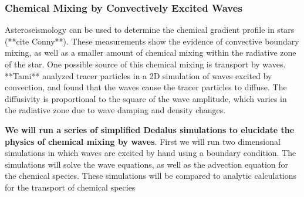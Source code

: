 {\color{purple}
\subsubsection{Chemical Mixing by Convectively Excited Waves}
}

Asteroseismology can be used to determine the chemical gradient profile in stars (**cite Conny**). These measurements show the evidence of convective boundary mixing, as well as a smaller amount of chemical mixing within the radiative zone of the star. One possible source of this chemical mixing is transport by waves. **Tami** analyzed tracer particles in a 2D simulation of waves excited by convection, and found that the waves cause the tracer particles to diffuse. The diffusivity is proportional to the square of the wave amplitude, which varies in the radiative zone due to wave damping and density changes.

\textbf{We will run a series of simplified Dedalus simulations to elucidate the physics of chemical mixing by waves}. First we will run two dimensional simulations in which waves are excited by hand using a boundary condition. The simulations will solve the wave equations, as well as the advection equation for the chemical species. These simulations will be compared to analytic calculations for the transport of chemical species 
